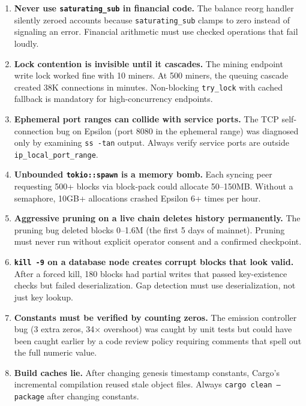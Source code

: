 \documentclass[12pt,a4paper]{article}
\begin{document}
\begin{enumerate}[leftmargin=*, label=\textbf{L\arabic*.}]
    \item \textbf{Never use \texttt{saturating\_sub} in financial code.} The balance reorg handler silently zeroed accounts because \texttt{saturating\_sub} clamps to zero instead of signaling an error. Financial arithmetic must use checked operations that fail loudly.

    \item \textbf{Lock contention is invisible until it cascades.} The mining endpoint write lock worked fine with 10 miners. At 500 miners, the queuing cascade created 38K connections in minutes. Non-blocking \texttt{try\_lock} with cached fallback is mandatory for high-concurrency endpoints.

    \item \textbf{Ephemeral port ranges can collide with service ports.} The TCP self-connection bug on Epsilon (port 8080 in the ephemeral range) was diagnosed only by examining \texttt{ss -tan} output. Always verify service ports are outside \texttt{ip\_local\_port\_range}.

    \item \textbf{Unbounded \texttt{tokio::spawn} is a memory bomb.} Each syncing peer requesting 500+ blocks via block-pack could allocate 50--150MB. Without a semaphore, 10GB+ allocations crashed Epsilon 6+ times per hour.

    \item \textbf{Aggressive pruning on a live chain deletes history permanently.} The pruning bug deleted blocks 0--1.6M (the first 5 days of mainnet). Pruning must never run without explicit operator consent and a confirmed checkpoint.

    \item \textbf{\texttt{kill -9} on a database node creates corrupt blocks that look valid.} After a forced kill, 180 blocks had partial writes that passed key-existence checks but failed deserialization. Gap detection must use deserialization, not just key lookup.

    \item \textbf{Constants must be verified by counting zeros.} The emission controller bug (3 extra zeros, 34$\times$ overshoot) was caught by unit tests but could have been caught earlier by a code review policy requiring comments that spell out the full numeric value.

    \item \textbf{Build caches lie.} After changing genesis timestamp constants, Cargo's incremental compilation reused stale object files. Always \texttt{cargo clean --package} after changing constants.


\end{enumerate}
\end{document}
